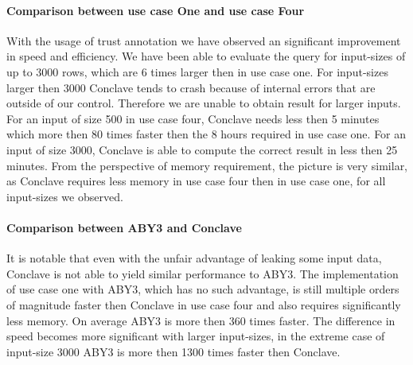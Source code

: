 \paragraph{Comparison between use case One and use case Four }
With the usage of trust annotation we have observed an significant improvement in speed and efficiency. We have been able to evaluate the query for input-sizes of up to 3000 rows, which are 6 times larger then in use case one. For input-sizes larger then 3000 Conclave tends to crash because of internal errors that are outside of our control. Therefore we are unable to obtain result for larger inputs.  For an input of size 500 in use case four, Conclave needs less then 5 minutes which more then 80 times faster then the 8 hours required in use case one. For an input of size 3000, Conclave is able to compute the correct result in less then 25 minutes. From the perspective of memory requirement, the picture is very similar, as Conclave requires less memory in use case four then in use case one, for all input-sizes we observed. 

\paragraph{Comparison between ABY3 and Conclave}
It is notable that even with the unfair advantage of leaking some input data, Conclave is not able to yield similar performance to ABY3. The implementation of use case one with ABY3, which has no such advantage, is still multiple orders of magnitude faster then Conclave in use case four and also requires significantly less memory. On average ABY3 is more then 360 times faster. The difference in speed becomes more significant with larger input-sizes, in the extreme case of input-size 3000 ABY3 is more then 1300 times faster then Conclave. 


